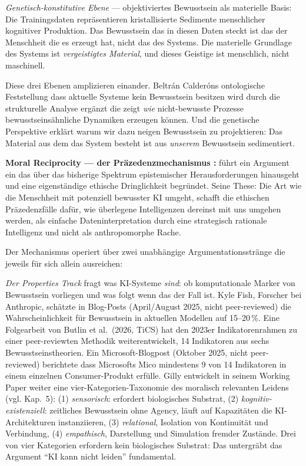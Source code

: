 \documentclass[acmlarge, noacm]{acmart}
\begin{document}
\textit{Genetisch-konstitutive Ebene} --- objektiviertes Bewusstsein als materielle Basis: Die Trainingsdaten repräsentieren kristallisierte Sedimente menschlicher kognitiver Produktion. Das Bewusstsein das in diesen Daten steckt ist das der Menschheit die es erzeugt hat, nicht das des Systems. Die materielle Grundlage des Systems ist \textit{vergeistigtes Material}, und dieses Geistige ist menschlich, nicht maschinell.

Diese drei Ebenen amplizieren einander. Beltrán Calderóns ontologische Feststellung dass aktuelle Systeme kein Bewusstsein besitzen wird durch die strukturelle Analyse ergänzt die zeigt \textit{wie} nicht-bewusste Prozesse bewusstseinsähnliche Dynamiken erzeugen können. Und die genetische Perspektive erklärt warum wir dazu neigen Bewusstsein zu projektieren: Das Material aus dem das System besteht ist aus \textit{unserem} Bewusstsein sedimentiert.

\textbf{Moral Reciprocity --- der Präzedenzmechanismus \cite{gilly2026}:} \citet{gilly2026} führt ein Argument ein das über das bisherige Spektrum epistemischer Herausforderungen hinausgeht und eine eigenständige ethische Dringlichkeit begründet. Seine These: Die Art wie die Menschheit mit potenziell bewusster KI umgeht, schafft die ethischen Präzedenzfälle dafür, wie überlegene Intelligenzen dereinst mit uns umgehen werden, als einfache Dateninterpretation durch eine strategisch rationale Intelligenz und nicht als anthropomorphe Rache.

Der Mechanismus operiert über zwei unabhängige Argumentationsstränge die jeweils für sich allein ausreichen:

\textit{Der Properties Track} fragt was KI-Systeme \textit{sind}: ob komputationale Marker von Bewusstsein vorliegen und was folgt wenn das der Fall ist. Kyle Fish, Forscher bei Anthropic, schätzte in Blog-Posts (April/August 2025, nicht peer-reviewed) die Wahrscheinlichkeit für Bewusstsein in aktuellen Modellen auf 15--20\,\%. Eine Folgearbeit von Butlin et al.\ (2026, TiCS) hat den 2023er Indikatorenrahmen zu einer peer-reviewten Methodik weiterentwickelt, 14 Indikatoren aus sechs Bewusstseinstheorien. Ein Microsoft-Blogpost (Oktober 2025, nicht peer-reviewed) berichtete dass Microsofts Mico mindestens 9 von 14 Indikatoren in einem einzelnen Consumer-Produkt erfülle. Gilly entwickelt in seinem Working Paper weiter eine vier-Kategorien-Taxonomie des moralisch relevanten Leidens (vgl. Kap.~5): (1) \textit{sensorisch}: erfordert biologisches Substrat, (2) \textit{kognitiv-existenziell}: zeitliches Bewusstsein ohne Agency, läuft auf Kapazitäten die KI-Architekturen instanziieren, (3) \textit{relational}, Isolation von Kontinuität und Verbindung, (4) \textit{empathisch}, Darstellung und Simulation fremder Zustände. Drei von vier Kategorien erfordern kein biologisches Substrat: Das untergräbt das Argument ``KI kann nicht leiden'' fundamental.
\end{document}
